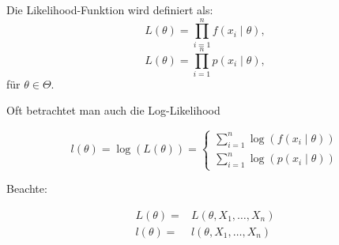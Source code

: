 \documentclass[10pt]{article}
\newcommand{\FZV}{X_1, \ldots, X_n} %
\newcommand{\eqname}[1]{\tag*{#1}}%
\begin{document}
	\begin{Definition} 
		Die Likelihood-Funktion wird definiert als:
		\begin{equation*}
			L(\theta) = \prod_{i=1}^{n} f(x_i \mid \theta), \eqname{wenn stetig}
		\end{equation*}
		\begin{equation*}
			L(\theta) = \prod_{i=1}^{n} p(x_i \mid \theta), \eqname{wenn diskret}
		\end{equation*}
		für $\theta \in \Theta$.
	\end{Definition}
	
	Oft betrachtet man auch die Log-Likelihood
	
	\begin{Definition} 
		\begin{equation*}
			l(\theta) = \log ( L(\theta)) = \begin{cases}
				\sum_{i=1}^{n} \log (f(x_i \mid \theta)) \\
				\sum_{i=1}^{n} \log (p(x_i \mid \theta)) 
			\end{cases}
		\end{equation*}
	\end{Definition}
	
	Beachte: 
	
	\begin{equation*}
		\begin{split}
			L(\theta) =& L(\theta, \FZV)\\
			l(\theta) =&l(\theta, \FZV)
		\end{split}
		\eqname{zufällig}
	\end{equation*}
	
\end{document}
